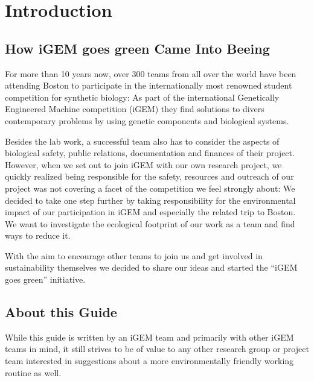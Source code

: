 
\chapter*{Introduction}
\section*{How iGEM goes green Came Into Beeing}
For more than 10 years now, over 300 teams from all over the world have been attending Boston to participate in the internationally most renowned student competition for synthetic biology: As part of the international Genetically Engineered Machine competition (iGEM) they find solutions to divers contemporary problems by using genetic components and biological systems.

Besides the lab work, a successful team also has to consider the aspects of biological safety, public relations, documentation and finances of their project. However, when we set out to join iGEM with our own research project, we quickly realized being responsible for the safety, resources and outreach of our project was not covering a facet of the competition we feel strongly about: We decided to take one step further by taking responsibility for the environmental impact of our participation in iGEM and especially the related trip to Boston. We want to investigate the ecological footprint of our work as a team and find ways to reduce it. 

With the aim to encourage other teams to join us and get involved in sustainability themselves we decided to share our ideas and started the “iGEM goes green” initiative.

\section*{About this Guide}
While this guide is written by an iGEM team and primarily with other iGEM teams in mind, it still strives to be of value to any other research group or project team interested in suggestions about a more environmentally friendly working routine as well.


